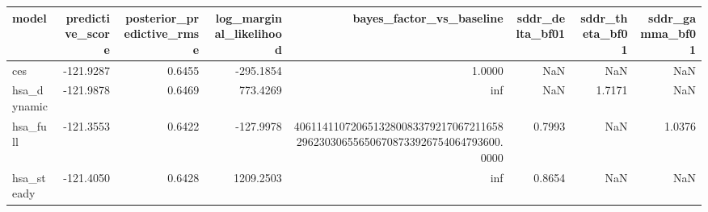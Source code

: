 \begin{tabular}{lrrrrrrr}
\toprule
model & predictive\_score & posterior\_predictive\_rmse & log\_marginal\_likelihood & bayes\_factor\_vs\_baseline & sddr\_delta\_bf01 & sddr\_theta\_bf01 & sddr\_gamma\_bf01 \\
\midrule
ces & -121.9287 & 0.6455 & -295.1854 & 1.0000 & NaN & NaN & NaN \\
hsa\_dynamic & -121.9878 & 0.6469 & 773.4269 & inf & NaN & 1.7171 & NaN \\
hsa\_full & -121.3553 & 0.6422 & -127.9978 & 4061141107206513280083379217067211658296230306556506708733926754064793600.0000 & 0.7993 & NaN & 1.0376 \\
hsa\_steady & -121.4050 & 0.6428 & 1209.2503 & inf & 0.8654 & NaN & NaN \\
\bottomrule
\end{tabular}
